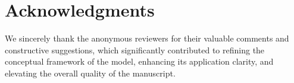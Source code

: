 \documentclass[authoryear,preprint,review,12pt]{elsarticle}
\begin{document}


\section*{Acknowledgments}

We sincerely thank the anonymous reviewers for their valuable comments and constructive suggestions, which significantly contributed to refining the conceptual framework of the model, enhancing its application clarity, and elevating the overall quality of the manuscript.

\baselineskip12pt
 
 
\end{document}
